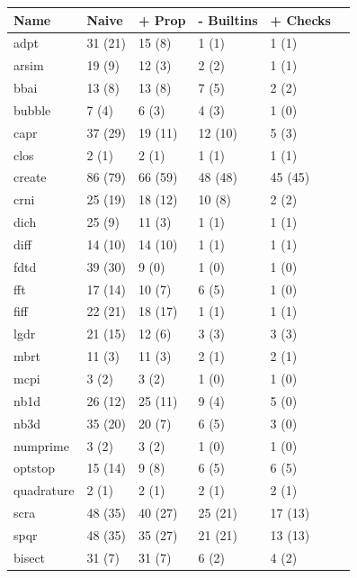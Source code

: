 \begin{table}
\centering
  \begin{tabular}{| l | l | l | l | l | l |}
  \hline
  Name & Naive & + Prop & - Builtins & + Checks \\ \hline
  adpt        & 31 (21) & 15 (8) & 1 (1) & 1 (1) \\ \hline
  arsim       & 19 (9) & 12 (3) & 2 (2) & 1 (1) \\ \hline
  bbai        & 13 (8) & 13 (8) & 7 (5) & 2 (2) \\ \hline
  bubble      & 7 (4) & 6 (3) & 4 (3) & 1 (0) \\ \hline
  capr        & 37 (29) & 19 (11) & 12 (10) & 5 (3) \\ \hline
  clos        & 2 (1) & 2 (1) & 1 (1) & 1 (1) \\ \hline
  create      & 86 (79) & 66 (59) & 48 (48) & 45 (45) \\ \hline
  crni        & 25 (19) & 18 (12) & 10 (8) & 2 (2) \\ \hline
  dich        & 25 (9) & 11 (3) & 1 (1) & 1 (1)  \\ \hline
  diff        & 14 (10) & 14 (10) & 1 (1) & 1 (1) \\ \hline
  fdtd        & 39 (30) & 9 (0) & 1 (0) & 1 (0) \\ \hline
  fft         & 17 (14) & 10 (7) & 6 (5) & 1 (0) \\ \hline
  fiff        & 22 (21) & 18 (17) & 1 (1) & 1 (1) \\ \hline
  lgdr        & 21 (15) & 12 (6) & 3 (3) & 3 (3) \\ \hline
  mbrt        & 11 (3) & 11 (3) & 2 (1) & 2 (1) \\ \hline
  mcpi        & 3 (2) & 3 (2) & 1 (0) & 1 (0) \\ \hline
  nb1d        & 26 (12) & 25 (11) & 9 (4) & 5 (0) \\ \hline
  nb3d        & 35 (20) & 20 (7) & 6 (5) & 3 (0) \\ \hline
  numprime    & 3 (2) & 3 (2) & 1 (0) & 1 (0) \\ \hline
  optstop     & 15 (14) & 9 (8) & 6 (5) & 6 (5) \\ \hline
  quadrature  & 2 (1) & 2 (1) & 2 (1) & 2 (1)\\ \hline
  scra        & 48 (35) & 40 (27) & 25 (21) & 17 (13) \\ \hline
  spqr        & 48 (35) & 35 (27) & 21 (21) & 13 (13) \\ \hline
  bisect      & 31 (7) & 31 (7) & 6 (2) & 4 (2) \\ \hline

\end{tabular}
\end{table}
